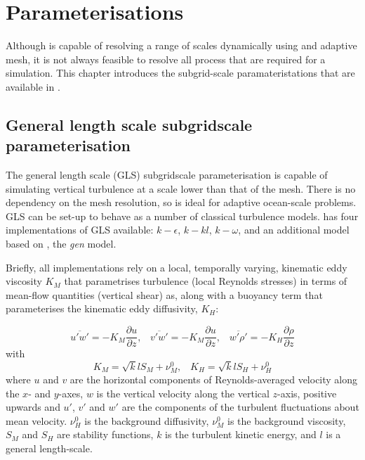 \chapter{Parameterisations}\label{chap:parameterisations}

Although \fluidity is capable of resolving a range of scales dynamically using 
and adaptive mesh, it is not always feasible to resolve all process that are
required for a simulation. This chapter introduces the subgrid-scale paramateristations
that are available in \fluidity.

\section{General length scale subgridscale parameterisation}\label{Sec:GLS}

The general length scale (GLS) subgridscale parameterisation is capable of simulating vertical
turbulence at a scale lower than that of the mesh. There is no dependency on the mesh resolution, 
so is ideal for adaptive ocean-scale problems. GLS can be set-up to behave as a number of classical
turbulence models. \fluidity has four implementations of GLS available: $k-\epsilon$, $k-kl$, $k-\omega$, 
and an additional model based on \citet{umlauf2003}, the \emph{gen} model. 

Briefly, all implementations rely on a local, temporally varying, kinematic eddy 
viscosity $K_M$ that parametrises turbulence (local Reynolds stresses) in terms of mean-flow 
quantities (vertical shear) as, along 
with a buoyancy term that parameterises the kinematic eddy diffusivity, $K_H$:

\begin{equation}
\overline{u'w'} = -K_M\frac{\partial u}{\partial z},\;\;\;
\overline{v'w'} = -K_M\frac{\partial u}{\partial z},\;\;\;
\overline{w'\rho'} = -K_H\frac{\partial\rho}{\partial z}
\end{equation} 
with
\begin{equation}
K_M = \sqrt{k}lS_M+\nu_M^0, \;\;\;
K_H = \sqrt{k}lS_H+\nu_H^0
\label{eq:diff}
\end{equation}
where $u$ and $v$ are the horizontal components of Reynolds-averaged velocity along the $x$- and $y$-axes, $w$ is 
the vertical velocity along the vertical $z$-axis, positive upwards and $u'$, $v'$ and $w'$ are the components 
of the turbulent fluctuations about mean velocity. $\nu_H^0$ is the background diffusivity, $\nu_M^0$ 
is the background viscosity, $S_M$ and $S_H$ are stability functions, 
$k$ is the turbulent kinetic energy, and $l$ is a general length-scale.

